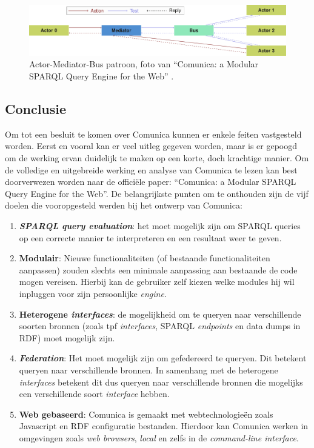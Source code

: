 \begin{figure}
    \centering
    \includegraphics[width=\linewidth]{images/comunica-actor-mediator-bus.png}
    \caption{Actor-Mediator-Bus patroon, foto van ``Comunica: a Modular SPARQL Query Engine for the Web'' \cite{taelman2018comunica}.}
    \label{fig:actor-mediator-bus}
\end{figure}



\subsection{Conclusie}
Om tot een besluit te komen over Comunica kunnen er enkele feiten vastgesteld worden. Eerst en vooral kan er veel uitleg gegeven worden, maar is er gepoogd om de werking ervan duidelijk te maken op een korte, doch krachtige manier. Om de volledige en uitgebreide werking en analyse van Comunica te lezen kan best doorverwezen worden naar de officiële paper: ``Comunica: a Modular SPARQL Query Engine for the Web''. De belangrijkste punten om te onthouden zijn de vijf doelen die vooropgesteld werden bij het ontwerp van Comunica:
\begin{enumerate}
    \item \textbf{\textit{SPARQL query evaluation}}: het moet mogelijk zijn om SPARQL queries op een correcte manier te interpreteren en een resultaat weer te geven.
    \item \textbf{Modulair}: Nieuwe functionaliteiten (of bestaande functionaliteiten aanpassen) zouden slechts een minimale aanpassing aan bestaande de code mogen vereisen. Hierbij kan de gebruiker zelf kiezen welke modules hij wil inpluggen voor zijn persoonlijke \textit{engine}.
    \item \textbf{Heterogene \textit{interfaces}}: de mogelijkheid om te queryen naar verschillende soorten bronnen (zoals \acrshort{tpf} \textit{interfaces}, SPARQL \textit{endpoints} en data dumps in RDF) moet mogelijk zijn.
    \item \textbf{\textit{Federation}}: Het moet mogelijk zijn om gefedereerd te queryen. Dit betekent queryen naar verschillende bronnen. In samenhang met de heterogene \textit{interfaces} betekent dit dus queryen naar verschillende bronnen die mogelijks een verschillende soort \textit{interface} hebben.
    \item \textbf{Web gebaseerd}: Comunica is gemaakt met webtechnologieën zoals Javascript en RDF configuratie bestanden. Hierdoor kan Comunica werken in omgevingen zoals \textit{web browsers}, \textit{local} en zelfs in de \textit{command-line interface}.
\end{enumerate}